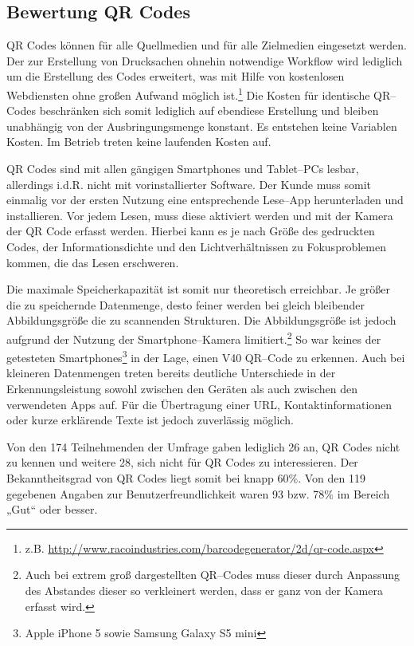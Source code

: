 \subsection{Bewertung QR Codes} %
\label{sub:bewertung_qr_codes}
QR Codes können für alle Quellmedien und für alle Zielmedien eingesetzt werden. Der zur Erstellung von Drucksachen ohnehin notwendige Workflow wird lediglich um die Erstellung des Codes erweitert, was mit Hilfe von kostenlosen Webdiensten ohne großen Aufwand möglich ist.\footnote{z.B. \url{http://www.racoindustries.com/barcodegenerator/2d/qr-code.aspx}} Die Kosten für identische QR–Codes beschränken sich somit lediglich auf ebendiese Erstellung und bleiben unabhängig von der Ausbringungsmenge konstant. Es entstehen keine Variablen Kosten. Im Betrieb treten keine laufenden Kosten auf.

QR Codes sind mit allen gängigen Smartphones und Tablet–PCs lesbar, allerdings i.d.R. nicht mit vorinstallierter Software. Der Kunde muss somit einmalig vor der ersten Nutzung eine entsprechende Lese–App herunterladen und installieren. Vor jedem Lesen, muss diese aktiviert werden und mit der Kamera der QR Code erfasst werden. Hierbei kann es je nach Größe des gedruckten Codes, der Informationsdichte und den Lichtverhältnissen zu Fokusproblemen kommen, die das Lesen erschweren.   

Die maximale Speicherkapazität ist somit nur theoretisch erreichbar. Je größer die zu speichernde Datenmenge, desto feiner werden bei gleich bleibender Abbildungsgröße die zu scannenden Strukturen. Die Abbildungsgröße ist jedoch aufgrund der Nutzung der Smartphone–Kamera limitiert.\footnote{Auch bei extrem groß dargestellten QR–Codes muss dieser durch Anpassung des Abstandes dieser so verkleinert werden, dass er ganz von der Kamera erfasst wird.} So war keines der getesteten Smartphones\footnote{Apple iPhone 5 sowie Samsung Galaxy S5 mini} in der Lage, einen V40 QR–Code zu erkennen. Auch bei kleineren Datenmengen treten bereits deutliche Unterschiede in der Erkennungsleistung sowohl zwischen den Geräten als auch zwischen den verwendeten Apps auf. Für die Übertragung einer \ac{URL}, Kontaktinformationen oder kurze erklärende Texte ist jedoch zuverlässig möglich.

Von den 174 Teilnehmenden der Umfrage gaben lediglich 26 an, QR Codes nicht zu kennen und weitere 28, sich nicht für QR Codes zu interessieren. Der Bekanntheitsgrad von QR Codes liegt somit bei knapp 60\%. Von den 119 gegebenen Angaben zur Benutzerfreundlichkeit waren 93 bzw. 78\% im Bereich „Gut“ oder besser. 

